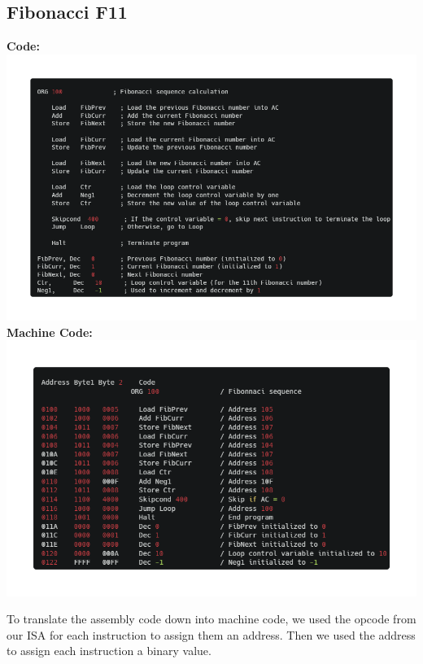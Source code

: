 \documentclass[12pt]{article}
\begin{document}
\subsection{Fibonacci F11}
\textbf{Code:}\\
\includegraphics[width=\linewidth]{images/fibonacci.png}
\textbf{Machine Code:}\\
\includegraphics[width=\linewidth]{images/fibonacci_machine.png}

\noindent To translate the assembly code down into machine code, we used the opcode from our ISA for each
instruction to assign them an address. Then we used the address to assign each instruction a binary value.\\
\end{document}
